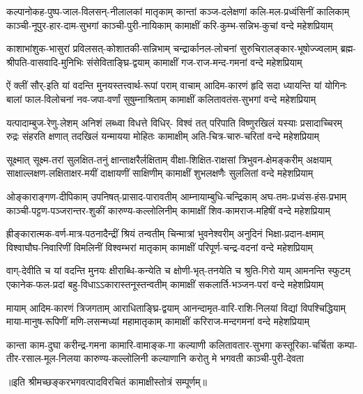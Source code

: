 
\setlength{\shlokaspaceskip}{16pt}
\fourlineindentedshloka
{कल्पानोकह-पुष्प-जाल-विलसन्-नीलालकां मातृकाम्}
{कान्तां कञ्ज-दलेक्षणां कलि-मल-प्रध्वंसिनीं कालिकाम्}
{काञ्ची-नूपुर-हार-दाम-सुभगां काञ्ची-पुरी-नायिकाम्}
{कामाक्षीं करि-कुम्भ-सन्निभ-कुचां वन्दे महेशप्रियाम्}%

\fourlineindentedshloka
{काशाभांशुक-भासुरां प्रविलसत्-कोशातकी-सन्निभाम्}
{चन्द्रार्कानल-लोचनां सुरुचिरालङ्कार-भूषोज्ज्वलाम्}
{ब्रह्म-श्रीपति-वासवादि-मुनिभिः संसेविताङ्घ्रि-द्वयाम्}
{कामाक्षीं गज-राज-मन्द-गमनां वन्दे महेशप्रियाम्}%

\fourlineindentedshloka
{ऐं क्लीं सौर्-इति यां वदन्ति मुनयस्तत्त्वार्थ-रूपां पराम्}
{वाचाम् आदिम-कारणं हृदि सदा ध्यायन्ति यां योगिनः}
{बालां फाल-विलोचनां नव-जपा-वर्णां सुषुम्नाश्रिताम्}
{कामाक्षीं कलितावतंस-सुभगां वन्दे महेशप्रियाम्}%

\fourlineindentedshloka
{यत्पादाम्बुज-रेणु-लेशम् अनिशं लब्ध्वा विधत्ते विधिर्-}
{विश्वं तत् परिपाति विष्णुरखिलं यस्याः प्रसादाच्चिरम्}
{रुद्रः संहरति क्षणात् तदखिलं यन्मायया मोहितः}
{कामाक्षीम् अति-चित्र-चारु-चरितां वन्दे महेशप्रियाम्}%

\fourlineindentedshloka
{सूक्ष्मात् सूक्ष्म-तरां सुलक्षित-तनुं क्षान्ताक्षरैर्लक्षिताम्}
{वीक्षा-शिक्षित-राक्षसां त्रिभुवन-क्षेमङ्करीम् अक्षयाम्}
{साक्षाल्लक्षण-लक्षिताक्षर-मयीं दाक्षायणीं साक्षिणीम्}
{कामाक्षीं शुभलक्षणैः सुललितां वन्दे महेशप्रियाम्}%

\fourlineindentedshloka
{ओङ्काराङ्गण-दीपिकाम् उपनिषत्-प्रासाद-पारावतीम्}
{आम्नायाम्बुधि-चन्द्रिकाम् अघ-तमः-प्रध्वंस-हंस-प्रभाम्}
{काञ्ची-पट्टण-पञ्जरान्तर-शुकीं कारुण्य-कल्लोलिनीम्}
{कामाक्षीं शिव-कामराज-महिषीं वन्दे महेशप्रियाम्}%

\fourlineindentedshloka
{ह्रीङ्कारात्मक-वर्ण-मात्र-पठनादैन्द्रीं श्रियं तन्वतीम्}
{चिन्मात्रां भुवनेश्वरीम् अनुदिनं भिक्षा-प्रदान-क्षमाम्}
{विश्वाघौघ-निवारिणीं विमलिनीं विश्वम्भरां मातृकाम्}
{कामाक्षीं परिपूर्ण-चन्द्र-वदनां वन्दे महेशप्रियाम्}%

\fourlineindentedshloka
{वाग्-देवीति च यां वदन्ति मुनयः क्षीराब्धि-कन्येति च}
{क्षोणी-भृत्-तनयेति च श्रुति-गिरो याम् आमनन्ति स्फुटम्}
{एकानेक-फल-प्रदां बहु-विधाऽऽकारास्तनूस्तन्वतीम्}
{कामाक्षीं सकलार्ति-भञ्जन-परां वन्दे महेशप्रियाम्}%

\fourlineindentedshloka
{मायाम् आदिम-कारणं त्रिजगताम् आराधिताङ्घ्रि-द्वयाम्}
{आनन्दामृत-वारि-राशि-निलयां विद्यां विपश्चिद्धियाम्}
{माया-मानुष-रूपिणीं मणि-लसन्मध्यां महामातृकाम्}
{कामाक्षीं करिराज-मन्दगमनां वन्दे महेशप्रियाम्}%

\fourlineindentedshloka
{कान्ता काम-दुघा करीन्द्र-गमना कामारि-वामाङ्क-गा}
{कल्याणी कलितावतार-सुभगा कस्तूरिका-चर्चिता}
{कम्पा-तीर-रसाल-मूल-निलया कारुण्य-कल्लोलिनी}
{कल्याणानि करोतु मे भगवती काञ्ची-पुरी-देवता}%

॥इति श्रीमच्छङ्करभगवत्पादविरचितं कामाक्षीस्तोत्रं सम्पूर्णम्॥
\setlength{\shlokaspaceskip}{24pt}
